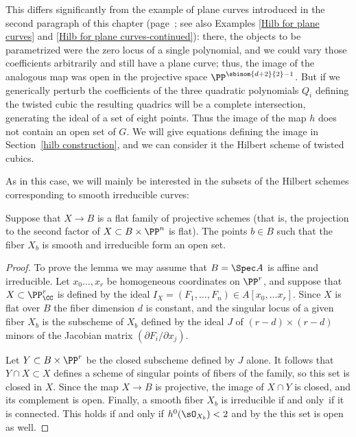 This differs significantly from
the example of plane curves introduced in the second paragraph of this chapter (page~\pageref{ModuliChapter}; see also Examples \ref{Hilb for plane curves} and \ref{Hilb for plane curves-continued}):
there, the objects to be parametrized were the
zero locus of a single polynomial, and we could vary those coefficients
arbitrarily and still have a plane curve; thus, the image of the analogous
map was open in the projective space $\PP^{\sbinom{d+2}{2}-1}$. But if
we generically
perturb the coefficients of the three quadratic polynomials $Q_i$
defining the twisted cubic the resulting quadrics will
be a complete intersection, generating
 the ideal of a set of eight points. Thus the image of the map $h$
 does not contain an open set of $G$.
We will give equations defining the image in Section~\ref{hilb
construction}, and we can consider it
the Hilbert scheme of twisted cubics.

As in this case, we will mainly be   interested in the subsets of the
Hilbert schemes corresponding to smooth irreducible curves:

\begin{lemma}
\label{smooth is open}
Suppose that $X \to B$ is a flat family of projective schemes (that is,
%
the projection to the second factor of
$X\subset B\times \PP^n$  is flat). The points $b\in B$ such that the
fiber $X_b$ is smooth and irreducible form an open set.
\end{lemma}

\begin{proof}
To prove the
lemma we may assume that $B = \Spec A$ is affine and
irreducible. Let $x_{0}\dots, x_{r}$ be homogeneous coordinates
on $\PP^{r}$, and suppose that
$X\subset \PP^{r}_{\CC}$ is defined by the ideal $I_{X} = (F_{1}, \dots,
F_{n}) \in A[x_{0}, \dots x_{r}]$.
Since $X$ is flat over $B$ the fiber dimension $d$ is constant, and the
singular locus
of a given fiber $X_{b}$ is  the subscheme of $X_{b}$ defined by the
ideal $J$ of
$(r-d)\times (r-d)$ minors of the Jacobian matrix $(\partial
F_{i}/\partial x_{j})$.

Let $Y\subset B\times \PP^{r}$ be the closed subscheme defined by $J$
alone.
It follows that $Y\cap X \subset X$ defines a scheme of singular points
of fibers of the family, so this set is closed
in $X$.
Since the map $X \to B$ is projective, the image of $X\cap Y$ is closed,
and its complement is open.
 Finally, a smooth fiber $X_b$ is irreducible if and only~if it is
 connected. This holds if and only if $h^0(\sO_{X_b}) <2$ and by the
%
\cite[Theorem 12.11]{Hartshorne1977} this set
 is open as well.
\end{proof}

